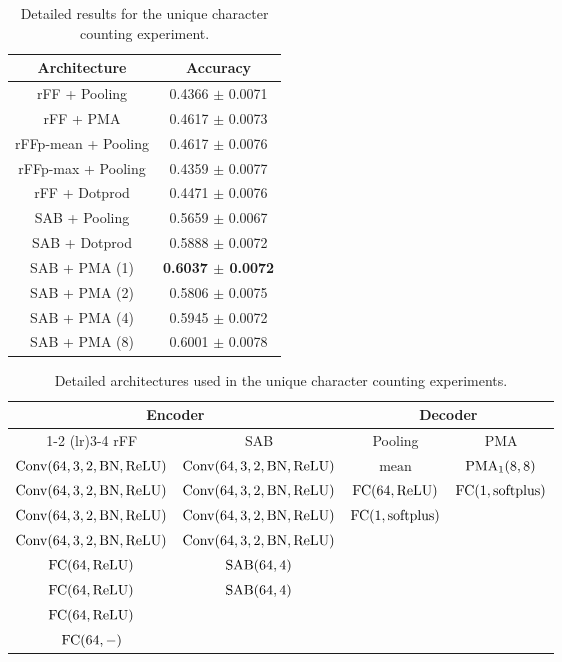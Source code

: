 \documentclass{article}
\begin{document}
\begin{table}[h]
\centering
\caption{Detailed results for the unique character counting experiment.}
\vspace{5pt}
\begin{tabular}{@{}cc@{}} \toprule
Architecture & Accuracy\\ \midrule
rFF + Pooling & 0.4366 $\pm$ 0.0071 \\
rFF + PMA & 0.4617 $\pm$ 0.0073\\
rFFp-mean + Pooling & 0.4617 $\pm$ 0.0076 \\
rFFp-max + Pooling & 0.4359 $\pm$ 0.0077 \\
rFF + Dotprod & 0.4471 $\pm$ 0.0076 \\
\hline
SAB + Pooling & 0.5659 $\pm$ 0.0067 \\
SAB + Dotprod & 0.5888 $\pm$ 0.0072 \\
SAB + PMA (1) & \bf 0.6037 $\pm$ 0.0072\\
SAB + PMA (2) & 0.5806 $\pm$ 0.0075\\
SAB + PMA (4) & 0.5945 $\pm$ 0.0072\\
SAB + PMA (8)  & 0.6001 $\pm$ 0.0078\\
\bottomrule
\end{tabular}
\label{table:appunique}
\end{table}

\begin{table}[h]
\small
\centering
\caption{Detailed architectures used in the unique character counting experiments.}
\vspace{5pt}
\begin{tabular}{@{}cccc@{}}\toprule
\multicolumn{2}{c}{Encoder} & \multicolumn{2}{c}{Decoder}\\
\cmidrule(lr){1-2} \cmidrule(lr){3-4}
rFF & SAB & Pooling & PMA \\
\midrule
$\mathrm{Conv}(64, 3, 2, \mathrm{BN}, \mathrm{ReLU})$ & $\mathrm{Conv}(64, 3, 2, \mathrm{BN}, \mathrm{ReLU})$ & $\mathrm{mean}$ & $\mathrm{PMA}_1(8, 8)$ \\
$\mathrm{Conv}(64, 3, 2, \mathrm{BN}, \mathrm{ReLU})$ & $\mathrm{Conv}(64, 3, 2, \mathrm{BN}, \mathrm{ReLU})$ & $\mathrm{FC}(64, \mathrm{ReLU})$ & $\mathrm{FC}(1, \mathrm{softplus})$ \\
$\mathrm{Conv}(64, 3, 2, \mathrm{BN}, \mathrm{ReLU})$ & $\mathrm{Conv}(64, 3, 2,\mathrm{BN},\mathrm{ReLU})$ & $\mathrm{FC}(1,\mathrm{softplus})$ & \\
$\mathrm{Conv}(64, 3, 2, \mathrm{BN}, \mathrm{ReLU})$ & $\mathrm{Conv}(64,3,2,\mathrm{BN},\mathrm{ReLU})$ & & \\
$\mathrm{FC}(64,\mathrm{ReLU})$ & $\mathrm{SAB}(64,4)$ & & \\
$\mathrm{FC}(64,\mathrm{ReLU})$ & $\mathrm{SAB}(64,4)$ & & \\
$\mathrm{FC}(64,\mathrm{ReLU})$& & & \\
$\mathrm{FC}(64,-)$ & & & \\
\bottomrule
\end{tabular}
\label{tab:unique_architecture}
\end{table}
\end{document}
